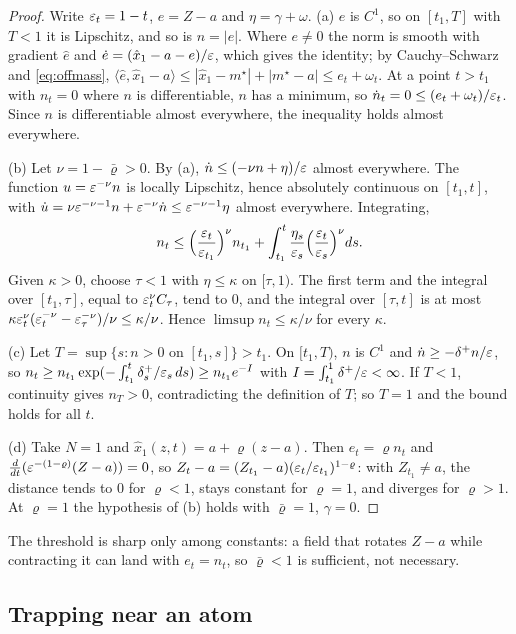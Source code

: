 \documentclass{article} %
\theoremstyle{plain}
\theoremstyle{definition}
\theoremstyle{remark}
\begin{document}
\begin{proof}
Write $\varepsilon_t=1-t$, $e=Z-a$ and $\eta=\gamma+\omega$. (a) $e$ is $C^1$, so on $[t_1,T]$ with
$T<1$ it is Lipschitz, and so is $n=|e|$. Where $e\ne0$ the norm is smooth with gradient $\hat e$
and $\dot e=(\hat x_1-a-e)/\varepsilon$, which gives the identity; by Cauchy--Schwarz and
\eqref{eq:offmass}, $\langle\hat e,\hat x_1-a\rangle\le|\hat x_1-m^\star|+|m^\star-a|\le e_t+\omega_t$.
At a point $t>t_1$ with $n_t=0$ where $n$ is differentiable, $n$ has a minimum, so
$\dot n_t=0\le(e_t+\omega_t)/\varepsilon_t$. Since $n$ is differentiable almost everywhere, the inequality
holds almost everywhere.

(b) Let $\nu=1-\bar\varrho>0$. By (a), $\dot n\le(-\nu n+\eta)/\varepsilon$ almost everywhere. The function
$u=\varepsilon^{-\nu}n$ is locally Lipschitz, hence absolutely continuous on $[t_1,t]$, with
$\dot u=\nu\varepsilon^{-\nu-1}n+\varepsilon^{-\nu}\dot n\le\varepsilon^{-\nu-1}\eta$ almost everywhere. Integrating,
\[
n_t\le\Big(\frac{\varepsilon_t}{\varepsilon_{t_1}}\Big)^{\nu}n_{t_1}
+\int_{t_1}^t\frac{\eta_s}{\varepsilon_s}\Big(\frac{\varepsilon_t}{\varepsilon_s}\Big)^{\nu}ds .
\]
Given $\kappa>0$, choose $\tau<1$ with $\eta\le\kappa$ on $[\tau,1)$. The first term and the
integral over $[t_1,\tau]$, equal to $\varepsilon_t^\nu C_\tau$, tend to $0$, and the integral over
$[\tau,t]$ is at most $\kappa\varepsilon_t^\nu(\varepsilon_t^{-\nu}-\varepsilon_\tau^{-\nu})/\nu\le\kappa/\nu$. Hence
$\limsup n_t\le\kappa/\nu$ for every $\kappa$.

(c) Let $T=\sup\{s:n>0\text{ on }[t_1,s]\}>t_1$. On $[t_1,T)$, $n$ is $C^1$ and
$\dot n\ge-\delta^+n/\varepsilon$, so $n_t\ge n_{t_1}\exp(-\int_{t_1}^t\delta^+_s/\varepsilon_s\,ds)\ge n_{t_1}e^{-I}$
with $I=\int_{t_1}^1\delta^+/\varepsilon<\infty$. If $T<1$, continuity gives $n_T>0$, contradicting the
definition of $T$; so $T=1$ and the bound holds for all $t$.

(d) Take $N=1$ and $\hat x_1(z,t)=a+\varrho(z-a)$. Then $e_t=\varrho n_t$ and
$\tfrac{d}{dt}(\varepsilon^{-(1-\varrho)}(Z-a))=0$, so $Z_t-a=(Z_{t_1}-a)(\varepsilon_t/\varepsilon_{t_1})^{1-\varrho}$: with
$Z_{t_1}\ne a$, the distance tends to $0$ for $\varrho<1$, stays constant for $\varrho=1$, and diverges
for $\varrho>1$. At $\varrho=1$ the hypothesis of (b) holds with $\bar\varrho=1$, $\gamma=0$.
\end{proof}

The threshold is sharp only among constants: a field that rotates $Z-a$ while contracting it can
land with $e_t=n_t$, so $\bar\varrho<1$ is sufficient, not necessary.

\subsection{Trapping near an atom}
\label{apx:pf-trap}
\end{document}
